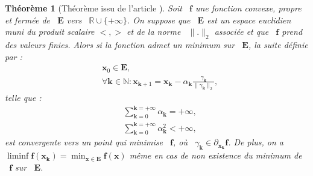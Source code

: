 \documentclass[publibook-draft]{CAp2012}
\newtheorem{theorem}{Théorème}
\newcommand{\af}{\mathbf{f}}
\newcommand{\bk}{\mathbf{k}}
\newcommand{\bx}{\mathbf{x}}
\newcommand{\me}{\mathbf{E}}
\begin{document}
\begin{theorem}[Théorème issu de l'article \cite{correa1993convergence}]\label{theoreme.sec}
Soit ~$\af$ une fonction convexe, propre et fermée de ~$\me$ vers ~$\mathbb{R}\cup\{+\infty\}$.
On suppose que ~$\me$ est un espace euclidien muni du produit scalaire $<,>$ et de la norme ~$\|.\|_2$ associée et que ~$\af$ prend des valeurs finies.
Alors si la fonction admet un minimum sur ~$\me$, la suite définie par :
\begin{align}
&\bx_0\in\me,
\\
&\forall \bk\in\mathbb{N} : \bx_{\bk+1}=\bx_\bk-\alpha_{\bk}\frac{\gamma_{\bk}}{\|\gamma_{\bk}\|_2},
\end{align}
telle que :
\begin{align}
&\sum_{\bk=0}^{\bk=+\infty}\alpha_{\bk}=+\infty,
\\
&\sum_{\bk=0}^{\bk=+\infty}\alpha_{\bk}^2<+\infty,
\end{align}
est convergente vers un point qui minimise ~$\af$, où ~$\gamma_{\bk}\in\partial_{\bx_\bk}\af$. De plus, on a ~$\liminf\af({\bx_\bk})=\min_{\bx\in\me}\af(\bx)$ même en cas de non existence du minimum de ~$\af$ sur ~$\me$.
\end{theorem}
\end{document}
